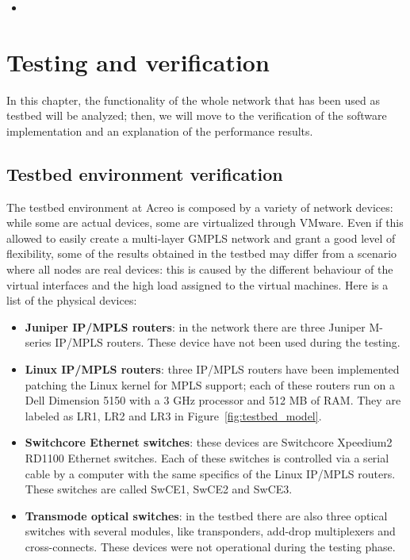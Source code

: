 \documentclass[10pt,a4paper]{report}
\begin{document}
\begin{itemize}
\item
\end{itemize}


\chapter{Testing and verification}
 
In this chapter, the functionality of the whole network that has been
used as testbed will be analyzed; then, we will move to the
verification of the software implementation and an explanation of the
performance results.
 
\section{Testbed environment verification}
 
The testbed environment at Acreo is composed by a variety of network
devices: while some are actual devices, some are virtualized through
VMware. Even if this allowed to easily create a multi-layer GMPLS
network and grant a good level of flexibility, some of the results
obtained in the testbed may differ from a scenario where all nodes are
real devices: this is caused by the different behaviour of the virtual
interfaces and the high load assigned to the virtual machines. Here is
a list of the physical devices:
\begin{itemize}
\item \textbf{Juniper IP/MPLS routers}: in the network there are three
  Juniper M-series IP/MPLS routers. These device have not been used
  during the testing.
\item \textbf{Linux IP/MPLS routers}: three IP/MPLS routers have been
  implemented patching the Linux kernel for MPLS support; each of
  these routers run on a Dell Dimension 5150 with a 3 GHz processor
  and 512 MB of RAM\@. They are labeled as LR1, LR2 and LR3 in
  Figure~\ref{fig:testbed_model}.
\item \textbf{Switchcore Ethernet switches}: these devices are
  Switchcore Xpeedium2 RD1100 Ethernet switches. Each of these
  switches is controlled via a serial cable by a computer with the
  same specifics of the Linux IP/MPLS routers. These switches are
  called SwCE1, SwCE2 and SwCE3.
\item \textbf{Transmode optical switches}: in the testbed there are
  also three optical switches with several modules, like transponders,
  add-drop multiplexers and cross-connects. These devices were not
  operational during the testing phase.
\end{itemize}
 
\end{document}
